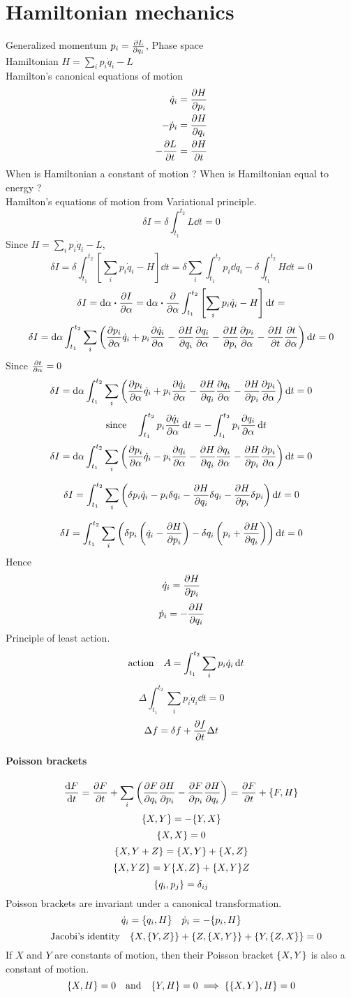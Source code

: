 \documentclass[12pt]{article}
\begin{document}
\section*{Hamiltonian mechanics}
Generalized momentum $p_i=\pdv{L}{q_i}$, Phase space\\
Hamiltonian $H=\sum_ip_i\dot{q}_i-L$\\
Hamilton's canonical equations of motion
\begin{align*}
\dot{q}_i&=\pdv{H}{p_i}\\
-\dot{p}_i&=\pdv{H}{q_i}\\
-\pdv{L}{t}&=\pdv{H}{t}
\end{align*}
When is Hamiltonian a constant of motion ? When is Hamiltonian equal to energy ?\\
Hamilton's equations of motion from Variational principle.
\[\delta{I}=\delta\int_{t_1}^{t_2}L\dd{t}=0\]
Since $H=\sum_ip_i\dot{q}_i-L$,
\[\delta{I}=\delta\int_{t_1}^{t_2}\left[\sum_ip_i\dot{q}_i-H\right]\dd{t}=\delta\sum_i\int_{t_1}^{t_2}p_i\dd{q}_i-\delta\int_{t_1}^{t_2}H\dd{t}=0\]
\[\delta{I}=\dd{\alpha}\vdot\pdv{I}{\alpha}=\dd{\alpha}\vdot\pdv{\alpha}\int_{t_1}^{t_2}\left[\sum_ip_i\dot{q}_i-H\right]\dd{t}=\]
\[\delta{I}=\dd{\alpha}\int_{t_1}^{t_2}\sum_i\left(\pdv{p_i}{\alpha}\dot{q}_i+p_i\pdv{\dot{q}_i}{\alpha}-\pdv{H}{q_i}\pdv{q_i}{\alpha}-\pdv{H}{p_i}\pdv{p_i}{\alpha}-\pdv{H}{t}\pdv{t}{\alpha}\right)\dd{t}=0\]
Since $\pdv{t}{\alpha}=0$
\[\delta{I}=\dd{\alpha}\int_{t_1}^{t_2}\sum_i\left(\pdv{p_i}{\alpha}\dot{q}_i+p_i\pdv{\dot{q}_i}{\alpha}-\pdv{H}{q_i}\pdv{q_i}{\alpha}-\pdv{H}{p_i}\pdv{p_i}{\alpha}\right)\dd{t}=0\]
\[\qq{since}\int_{t_1}^{t_2}p_i\pdv{\dot{q}_i}{\alpha}\dd{t}=-\int_{t_1}^{t_2}p_i\pdv{q_i}{\alpha}\dd{t}\]
\[\delta{I}=\dd{\alpha}\int_{t_1}^{t_2}\sum_i\left(\pdv{p_i}{\alpha}\dot{q}_i-p_i\pdv{q_i}{\alpha}-\pdv{H}{q_i}\pdv{q_i}{\alpha}-\pdv{H}{p_i}\pdv{p_i}{\alpha}\right)\dd{t}=0\]

\[\delta{I}=\int_{t_1}^{t_2}\sum_i\left(\delta{p_i}\dot{q}_i-p_i\delta{q_i}-\pdv{H}{q_i}\delta{q_i}-\pdv{H}{p_i}\delta{p_i}\right)\dd{t}=0\]

\[\delta{I}=\int_{t_1}^{t_2}\sum_i\left(\delta{p_i}\left(\dot{q}_i-\pdv{H}{p_i}\right)-\delta{q_i}\left(p_i+\pdv{H}{q_i}\right)\right)\dd{t}=0\]
Hence
\[\dot{q}_i=\pdv{H}{p_i}\]
\[\dot{p}_i=-\pdv{H}{q_i}\] 
Principle of least action.
\[\qq{action} A=\int_{t_1}^{t_2}\sum_{i}p_i\dot{q}_i\dd{t}\]
\[\Delta\int_{t_1}^{t_2}\sum_{i}p_i\dot{q}_i\dd{t}=0\]
\[\Delta{f}=\delta{f}+\pdv{f}{t}\Delta{t}\]
\paragraph{Poisson brackets}
\[\dv{F}{t}=\pdv{F}{t}+\sum_{i}\qty(\pdv{F}{q_i}\pdv{H}{p_i}-\pdv{F}{p_i}\pdv{H}{q_i})=\pdv{F}{t}+\pb{F}{H}\]
\[\pb{X}{Y}=-\pb{Y}{X}\]
\[\pb{X}{X}=0\]
\[\pb{X}{Y+Z}=\pb{X}{Y}+\pb{X}{Z}\]
\[\pb{X}{YZ}=Y\pb{X}{Z}+\pb{X}{Y}Z\]
\[\pb{q_i}{p_j}=\delta_{ij}\]
Poisson brackets are invariant under a canonical transformation.\\
\[\dot{q}_i=\pb{q_i}{H}\quad\dot{p}_i=-\pb{p_i}{H}\]
\[\qq{Jacobi's identity}\pb{X}{\pb{Y}{Z}}+\pb{Z}{\pb{X}{Y}}+\pb{Y}{\pb{Z}{X}}=0\]
If $X$ and $Y$ are constants of motion, then their Poisson bracket $\pb{X}{Y}$ is also a constant of motion.
\[\pb{X}{H}=0\qq{and}\pb{Y}{H}=0\implies\pb{\pb{X}{Y}}{H}=0\]
\end{document}
